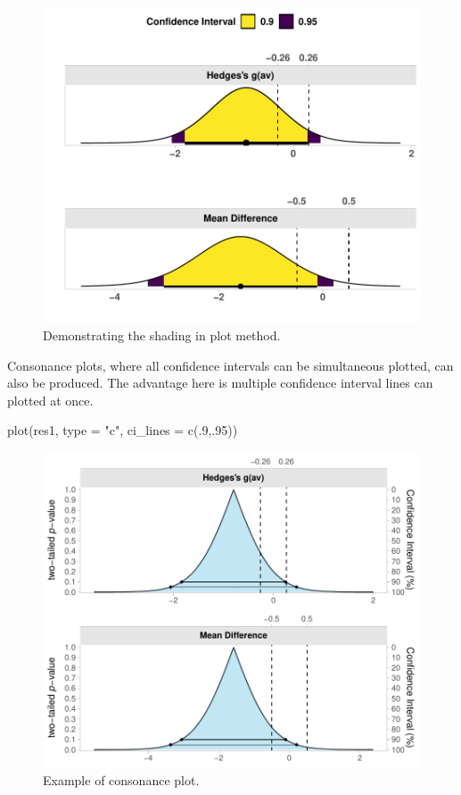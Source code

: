 \documentclass[]{interact}
\theoremstyle{plain}%
\theoremstyle{definition}
\theoremstyle{remark}
\newenvironment{Shaded}{\begin{snugshade}}{\end{snugshade}}
\newcommand{\AttributeTok}[1]{\textcolor[rgb]{0.77,0.63,0.00}{#1}}
\newcommand{\DecValTok}[1]{\textcolor[rgb]{0.00,0.00,0.81}{#1}}
\newcommand{\FunctionTok}[1]{\textcolor[rgb]{0.00,0.00,0.00}{#1}}
\newcommand{\NormalTok}[1]{#1}
\newcommand{\StringTok}[1]{\textcolor[rgb]{0.31,0.60,0.02}{#1}}
\begin{document}
\begin{figure}
\centering
\includegraphics{Avocado_Update_files/figure-latex/shadeplot-1.pdf}
\caption{Demonstrating the shading in plot method.}
\end{figure}

\newpage

Consonance plots, where all confidence intervals can be simultaneous
plotted, can also be produced. The advantage here is multiple confidence
interval lines can plotted at once.

\begin{Shaded}
\begin{Highlighting}[]
\FunctionTok{plot}\NormalTok{(res1, }\AttributeTok{type =} \StringTok{"c"}\NormalTok{,}
     \AttributeTok{ci\_lines =}  \FunctionTok{c}\NormalTok{(.}\DecValTok{9}\NormalTok{,.}\DecValTok{95}\NormalTok{))}
\end{Highlighting}
\end{Shaded}

\begin{figure}
\centering
\includegraphics{Avocado_Update_files/figure-latex/conplot-1.pdf}
\caption{Example of consonance plot.}
\end{figure}
\end{document}
